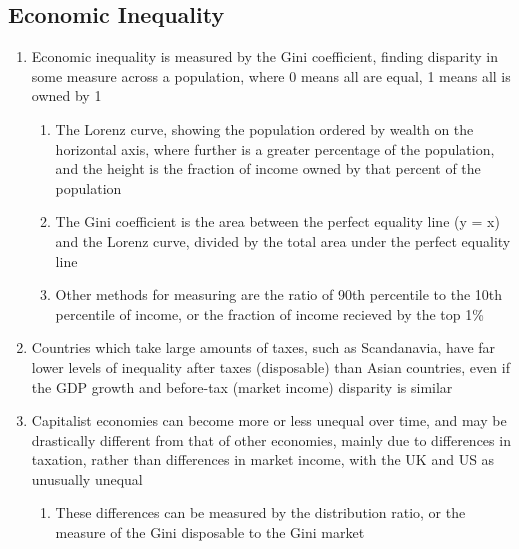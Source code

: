 \documentclass[11 pt, twoside]{article}
\begin{document}
\subsection{Economic Inequality}
\begin{enumerate}
\item Economic inequality is measured by the Gini coefficient, finding disparity in some measure across a population, where 0 means all are equal, 1 means all is owned by 1
\begin{enumerate}
\item The Lorenz curve, showing the population ordered by wealth on the horizontal axis, where further is a greater percentage of the population, and the height is the fraction of income owned by that percent of the population
\item The Gini coefficient is the area between the perfect equality line (y = x) and the Lorenz curve, divided by the total area under the perfect equality line
\item Other methods for measuring are the ratio of 90th percentile to the 10th percentile of income, or the fraction of income recieved by the top 1\%
\end{enumerate}
\item Countries which take large amounts of taxes, such as Scandanavia, have far lower levels of inequality after taxes (disposable) than Asian countries, even if the GDP growth and before-tax (market income) disparity is similar
\item Capitalist economies can become more or less unequal over time, and may be drastically different from that of other economies, mainly due to differences in taxation, rather than differences in market income, with the UK and US as unusually unequal
\begin{enumerate}
\item These differences can be measured by the distribution ratio, or the measure of the Gini disposable to the Gini market
\end{enumerate}
\end{enumerate}
\end{document}
